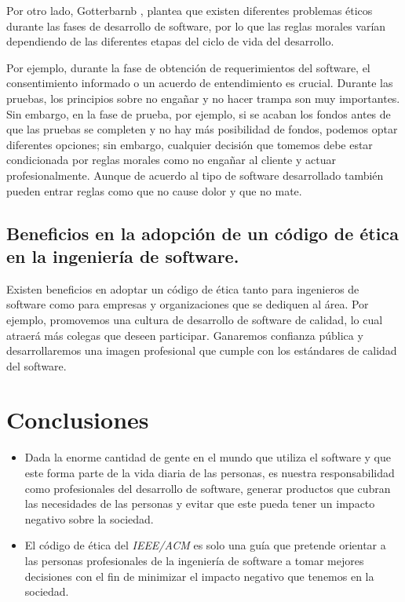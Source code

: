 \documentclass[twoside]{article}
\begin{document}
\begin{multicols}{2}
Por otro lado, Gotterbarnb \cite{gotterbarn2001software}, plantea que existen
diferentes problemas éticos durante las fases de desarrollo de software, por lo
que las reglas morales varían dependiendo de las diferentes etapas del ciclo de
vida del desarrollo.

Por ejemplo, durante la fase de obtención de requerimientos del software, el
consentimiento informado o un acuerdo de entendimiento es crucial. Durante las
pruebas, los principios sobre no engañar y no hacer trampa son muy importantes.
Sin embargo, en la fase de prueba, por ejemplo, si se acaban los fondos antes de
que las pruebas se completen y no hay más posibilidad de fondos, podemos optar
diferentes opciones; sin embargo, cualquier decisión que tomemos debe estar
condicionada por reglas morales como no engañar al cliente y actuar
profesionalmente. Aunque de acuerdo al tipo de software desarrollado también
pueden entrar reglas como que no cause dolor y que no mate.


\subsection{Beneficios en la adopción de un código de ética en la ingeniería de software.}

Existen beneficios en adoptar un código de ética tanto para ingenieros de
software como para empresas y organizaciones que se dediquen al área. Por
ejemplo, promovemos una cultura de desarrollo de software de calidad, lo cual
atraerá más colegas que deseen participar. Ganaremos confianza pública y
desarrollaremos una imagen profesional que cumple con los estándares de calidad
del software.



\pagebreak

\section{Conclusiones}

\begin{itemize}
\item Dada la enorme cantidad de gente en el mundo que utiliza el software y
que este forma parte de la vida diaria de las personas, es nuestra
responsabilidad como profesionales del desarrollo de software, generar productos
que cubran las necesidades de las personas y evitar que este pueda tener un
impacto negativo sobre la sociedad.

\item El código de ética del \textit{IEEE/ACM} es solo una guía que pretende
orientar a las personas profesionales de la ingeniería de software a tomar
mejores decisiones con el fin de minimizar el impacto negativo que tenemos en la
sociedad.



\end{itemize}
\end{multicols}
\end{document}
